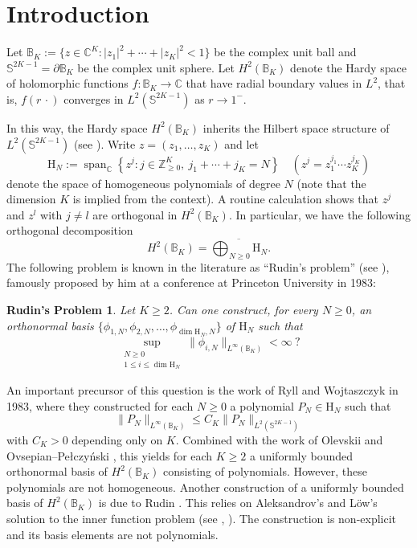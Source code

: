 \documentclass[a4paper,reqno,12pt]{amsart}
\theoremstyle{plain}
\theoremstyle{plain}
\newtheorem*{problem}{Rudin's Problem}
\theoremstyle{remark}
\theoremstyle{plain}
\newcommand{\PolySpace}{\mathrm{H}}
\newcommand{\z}{\mathbb{Z}}
\newcommand{\cp}{\mathbb{C}} %
\newcommand{\Sphere}{\mathbb{S}}
\theoremstyle{plain}
\theoremstyle{plain}
\providecommand{\widebar}{\overline}
\begin{document}
\section{Introduction}\label{sec:intro}
{
Let  $\mathbb B_K :=\{z\in\cp^K:
 |z_1|^2+\cdots+|z_K|^2<1\}$ be the complex unit ball and $\Sphere^{2K-1}=\partial {\mathbb B_K}$ be the complex unit sphere. Let $H^2(\mathbb B_K)$ {denote} the Hardy space of holomorphic functions} $f:\mathbb B_K\to \cp$ that have radial boundary values in $L^2$, that is, $f(r\,\cdot)$ converges in
$L^2(\Sphere^{2K-1})$ as $r\to1^-$. {In this way, the Hardy space $H^2(\mathbb B_K)$ inherits the Hilbert space structure of $L^2(\Sphere^{2K-1})$ (see \cite{R}). Write $z = (z_1, \ldots, z_K)$ and let
\[
\PolySpace_N :=\operatorname{span}_{\cp}
 \left\{z^j:j\in\z_{\geq 0}^K, \ j_1+\cdots+j_K=N\right\} \quad (z^{j} = z_1^{j_1} \cdots z_K^{j_K})
\]
denote the space of homogeneous polynomials of degree $N$ (note that the dimension $K$ is implied from the context). A routine calculation shows that $z^j$ and $z^l$ with $j\neq l$ are orthogonal in $H^2(\mathbb B_K)$. In particular, we have the following orthogonal decomposition
\[
 H^2(\mathbb B_K)=\widebar{\bigoplus_{N\geq0}\PolySpace_N}.
\]
The following problem is known in the literature as ``Rudin's problem'' (see \cite[p.~61]{GGSTW}), famously proposed by him at a conference at Princeton University in 1983:
\begin{problem}
Let $K \geq 2$.
Can one construct, for every $N\geq 0$, an orthonormal basis
$\{\phi_{1,N},\phi_{2,N}, \ldots, \phi_{\dim \PolySpace_N, N}\}$ 
of $\PolySpace_N$ such that
\[
\sup_{\substack{N \geq 0 \\ 1 \leq i \leq \dim \PolySpace_N}} \| \phi_{i, N} \|_{L^{\infty}(\mathbb B_K)} < \infty
 \ ?
\]
\end{problem}

An important precursor of this question is the work of Ryll and Wojtaszczyk \cite{RW} in 1983, where they constructed for each $N \geq 0$ a polynomial $P_N \in \PolySpace_N$
such that 
$$
\| P_N \|_{L^{\infty}(\mathbb B_K)} \leq C_K \| P_N \|_{L^2(\Sphere^{2K - 1})}
$$
with $C_K > 0$ depending only on $K$. Combined with the work of Olevskii
\cite[Chapter~4]{OlevskiiBook} and Ovsepian--Pe{\l}czy\'nski \cite{OvsepianPelczynski},
this yields for each $K \geq 2$ a uniformly bounded orthonormal basis of $H^2(\mathbb{B}_K)$ consisting of polynomials. However, these polynomials are not homogeneous.  Another construction of a uniformly bounded basis of $H^2(\mathbb{B}_K)$ is due to Rudin
\cite[Appendix~I]{RudinNew}. This relies on Aleksandrov's and L\"ow's solution to the inner function problem 
(see \cite{AleksandrovInner}, \cite{Low}). The construction is non-explicit and its
basis elements are not polynomials. 

}
\end{document}
